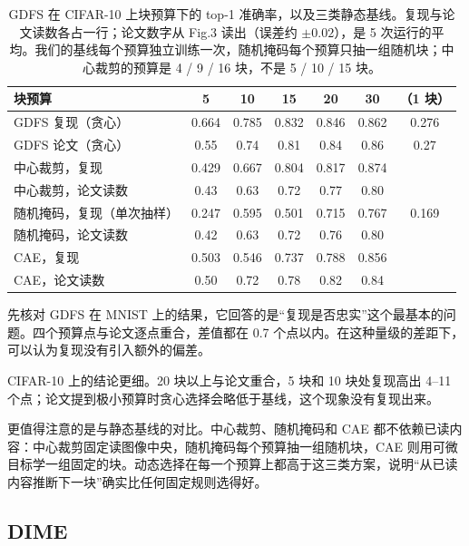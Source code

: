 \documentclass[11pt,a4paper,UTF8,fontset=none]{ctexart}
\begin{document}
\begin{table}[H]
\centering
\caption{GDFS 在 CIFAR-10 上块预算下的 top-1 准确率，以及三类静态基线。复现与论文读数各占一行；论文数字从 Fig.3 读出（误差约 $\pm0.02$），是 5 次运行的平均。我们的基线每个预算独立训练一次，随机掩码每个预算只抽一组随机块；中心裁剪的预算是 4 / 9 / 16 块，不是 5 / 10 / 15 块。}
\label{tab:gdfs-cifar}
\small
\begin{tabular}{lcccccc}
\toprule
块预算 & 5 & 10 & 15 & 20 & 30 & （1 块） \\
\midrule
GDFS 复现（贪心） & 0.664 & 0.785 & 0.832 & 0.846 & 0.862 & 0.276 \\
GDFS 论文（贪心） & 0.55 & 0.74 & 0.81 & 0.84 & 0.86 & 0.27 \\
\midrule
中心裁剪，复现 & 0.429 & 0.667 & 0.804 & 0.817 & 0.874 & \\
中心裁剪，论文读数 & 0.43 & 0.63 & 0.72 & 0.77 & 0.80 & \\
\midrule
随机掩码，复现（单次抽样） & 0.247 & 0.595 & 0.501 & 0.715 & 0.767 & 0.169 \\
随机掩码，论文读数 & 0.42 & 0.63 & 0.72 & 0.76 & 0.80 & \\
\midrule
CAE，复现 & 0.503 & 0.546 & 0.737 & 0.788 & 0.856 & \\
CAE，论文读数 & 0.50 & 0.72 & 0.78 & 0.82 & 0.84 & \\
\bottomrule
\end{tabular}
\end{table}

先核对 GDFS 在 MNIST 上的结果，它回答的是“复现是否忠实”这个最基本的问题。四个预算点与论文逐点重合，差值都在 0.7 个点以内。在这种量级的差距下，可以认为复现没有引入额外的偏差。

CIFAR-10 上的结论更细。20 块以上与论文重合，5 块和 10 块处复现高出 4--11 个点；论文提到极小预算时贪心选择会略低于基线，这个现象没有复现出来。

更值得注意的是与静态基线的对比。中心裁剪、随机掩码和 CAE 都不依赖已读内容：中心裁剪固定读图像中央，随机掩码每个预算抽一组随机块，CAE 则用可微目标学一组固定的块。动态选择在每一个预算上都高于这三类方案，说明“从已读内容推断下一块”确实比任何固定规则选得好。

\subsection{DIME}
\end{document}
